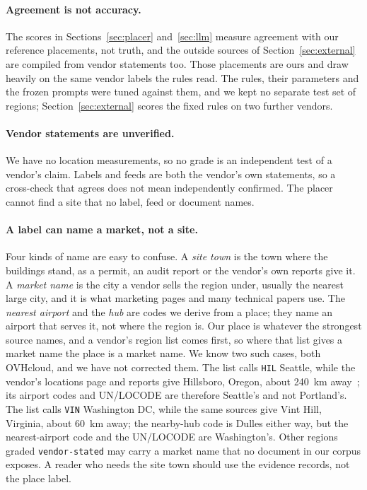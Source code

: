 \documentclass[10pt,twocolumn]{article}
\newcommand{\code}[1]{\texttt{#1}}
\begin{document}
\paragraph{Agreement is not accuracy.} The scores in Sections~\ref{sec:placer} and~\ref{sec:llm} measure agreement with our reference placements, not truth, and the outside sources of Section~\ref{sec:external} are compiled from vendor statements too. Those placements are ours and draw heavily on the same vendor labels the rules read. The rules, their parameters and the frozen prompts were tuned against them, and we kept no separate test set of regions; Section~\ref{sec:external} scores the fixed rules on two further vendors.

\paragraph{Vendor statements are unverified.} We have no location measurements, so no grade is an independent test of a vendor's claim. Labels and feeds are both the vendor's own statements, so a cross-check that agrees does not mean independently confirmed. The placer cannot find a site that no label, feed or document names.

\paragraph{A label can name a market, not a site.} Four kinds of name are easy to confuse. A \emph{site town} is the town where the buildings stand, as a permit, an audit report or the vendor's own reports give it. A \emph{market name} is the city a vendor sells the region under, usually the nearest large city, and it is what marketing pages and many technical papers use. The \emph{nearest airport} and the \emph{hub} are codes we derive from a place; they name an airport that serves it, not where the region is. Our place is whatever the strongest source names, and a vendor's region list comes first, so where that list gives a market name the place is a market name. We know two such cases, both OVHcloud, and we have not corrected them. The list calls \code{HIL} Seattle, while the vendor's locations page and reports give Hillsboro, Oregon, about 240~km away~\citep{ovh_regions,ovh_locations_us}; its airport codes and UN/LOCODE are therefore Seattle's and not Portland's. The list calls \code{VIN} Washington DC, while the same sources give Vint Hill, Virginia, about 60~km away; the nearby-hub code is Dulles either way, but the nearest-airport code and the UN/LOCODE are Washington's. Other regions graded \code{vendor-stated} may carry a market name that no document in our corpus exposes. A reader who needs the site town should use the evidence records, not the place label.
\end{document}
